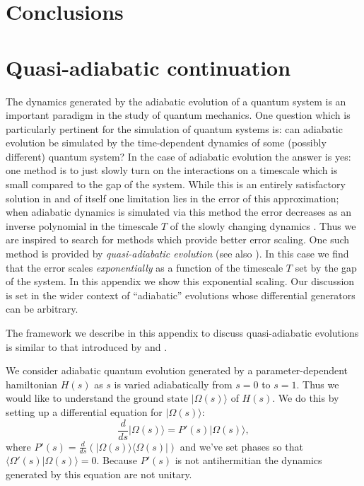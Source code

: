 \documentclass[twocolumn,lengthcheck,superscriptaddress]{revtex4-1}
\theoremstyle{definition}
\theoremstyle{remark}
\begin{document}
\section{Conclusions}



\widetext

\appendix

\section{Quasi-adiabatic continuation}\label{app:qacont}
The dynamics generated by the adiabatic evolution of a quantum
system is an important paradigm in the study of quantum mechanics.
One question which is particularly pertinent for the simulation of
quantum systems is: can adiabatic evolution be simulated by the
time-dependent dynamics of some (possibly different) quantum system?
In the case of adiabatic evolution the answer is yes: one method is
to just slowly turn on the interactions on a timescale which is
small compared to the gap of the system. While this is an entirely
satisfactory solution in and of itself one limitation lies in the
error of this approximation; when adiabatic dynamics is simulated
via this method the error decreases as an inverse polynomial in the
timescale $T$ of the slowly changing dynamics
\cite{reichardt:2004a}. Thus we are inspired to search for methods
which provide better error scaling. One such method is provided by
\emph{quasi-adiabatic evolution} \cite{wen:2005a} (see also
\cite{avron:1999a}). In this case we find that the error scales
\emph{exponentially} as a function of the timescale $T$ set by the
gap of the system. In this appendix we show this exponential
scaling. Our discussion is set in the wider context of ``adiabatic''
evolutions whose differential generators can be arbitrary.

The framework we describe in this appendix to discuss quasi-adiabatic
evolutions is similar to that introduced by \cite{avron:1999a} and
\cite{wen:2005a}.

We consider adiabatic quantum evolution generated by a
parameter-dependent hamiltonian $H(s)$ as $s$ is varied
adiabatically from $s=0$ to $s=1$. Thus we would like to understand
the ground state $|\Omega(s)\rangle$ of $H(s)$. We do this by
setting up a differential equation for $|\Omega(s)\rangle$:
\begin{equation}\label{eq:pformula}
\frac{d}{ds} |\Omega(s)\rangle = P'(s)|\Omega(s)\rangle,
\end{equation}
where $P'(s) = \frac{d}{ds}(|\Omega(s)\rangle\langle\Omega(s)|)$ and
we've set phases so that $\langle
\Omega'(s)|\Omega(s)\rangle = 0$. Because $P'(s)$ is not
antihermitian the dynamics generated by this equation are not
unitary.
\end{document}
